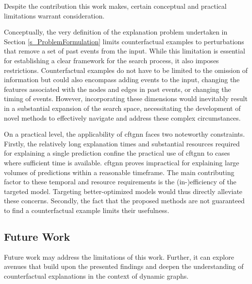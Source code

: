 Despite the contribution this work makes, certain conceptual and practical limitations warrant consideration.

Conceptually, the very definition of the explanation problem undertaken in Section \ref{s_ProblemFormulation} limits counterfactual examples to perturbations that remove a set of past events from the input. While this limitation is essential for establishing a clear framework for the search process, it also imposes restrictions. Counterfactual examples do not have to be limited to the omission of information but could also encompass adding events to the input, changing the features associated with the nodes and edges in past events, or changing the timing of events. However, incorporating these dimensions would inevitably result in a substantial expansion of the search space, necessitating the development of novel methods to effectively navigate and address these complex circumstances.

On a practical level, the applicability of \gls{cftgnn} faces two noteworthy constraints. Firstly, the relatively long explanation times and substantial resources required for explaining a single prediction confine the practical use of \gls{cftgnn} to cases where sufficient time is available. \gls{cftgnn} proves impractical for explaining large volumes of predictions within a reasonable timeframe. The main contributing factor to these temporal and resource requirements is the (in-)efficiency of the targeted model. Targeting better-optimized models would thus directly alleviate these concerns. Secondly, the fact that the proposed methods are not guaranteed to find a counterfactual example limits their usefulness. 





\subsection{Future Work}
\label{s_Conclusion_FutureWork}

Future work may address the limitations of this work. Further, it can explore avenues that build upon the presented findings and deepen the understanding of counterfactual explanations in the context of dynamic graphs. 

